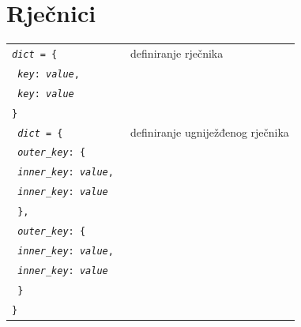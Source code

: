 \documentclass[10pt]{article}
\begin{document}
    \section*{\color{NavyBlue} Rječnici}
    \begin{tabular}{|>{\tt}p{9.00cm}|>{}p{15.50cm}|}
        \hline
        \textit{dict} = \{ & definiranje rječnika
        \\
        \hspace{10pt} \textit{key}: \textit{value}, &
        \\
        \hspace{10pt} \textit{key}: \textit{value} &
        \\
        \} &
        \\ \hline
        \textit{dict} = \{ & definiranje ugniježđenog rječnika \\
            \hspace{10pt} \textit{outer\_key}: \{ &
            \\
            \hspace{10pt} \hspace{10pt} \textit{inner\_key}: \textit{value}, &
            \\
            \hspace{10pt} \hspace{10pt} \textit{inner\_key}: \textit{value} &
            \\
            \hspace{10pt} \}, &
            \\
            \hspace{10pt} \textit{outer\_key}: \{ &
            \\
            \hspace{10pt} \hspace{10pt} \textit{inner\_key}: \textit{value}, &
            \\
            \hspace{10pt} \hspace{10pt} \textit{inner\_key}: \textit{value} &
            \\
            \hspace{10pt} \} &
            \\
            \} &
        \\ \hline
    \end{tabular}
\end{document}
